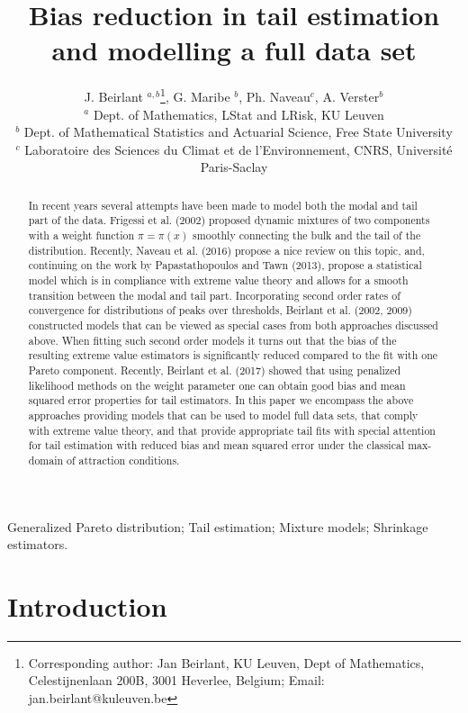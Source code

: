 \documentclass[a4paper,11pt]{article}
\title{Bias reduction in tail estimation and modelling a full data set}
\author{ J. Beirlant $^{a,b}$\footnote{Corresponding author: Jan Beirlant, KU Leuven, Dept of Mathematics, Celestijnenlaan 200B, 3001 Heverlee, Belgium; Email: jan.beirlant@kuleuven.be }, G. Maribe $^{b}$,  Ph. Naveau$^{c}$, A. Verster$^{b}$  \\
{\fontsize{8pt}{11pt} \selectfont $^a$ Dept. of Mathematics, LStat and LRisk, KU Leuven}
\\
{\fontsize{8pt}{11pt} \selectfont $^b$ Dept. of Mathematical Statistics and Actuarial Science, Free State University }
\\
{\fontsize{8pt}{11pt} \selectfont $^c$ Laboratoire des Sciences du Climat et de l'Environnement, CNRS, Universit\'e Paris-Saclay}
}
\begin{document}
 
\maketitle
\begin{abstract}
{\noindent In recent years several attempts have been made to model both the modal and tail part of the data. 
Frigessi et al. (2002) proposed dynamic mixtures of two components with a weight function $\pi=\pi (x)$ smoothly connecting the bulk and the tail of the distribution. 
Recently,  Naveau et al. (2016) propose a nice review on this topic, and, continuing on the work by Papastathopoulos and Tawn (2013), propose a statistical model which is in compliance with extreme value theory and allows for a smooth transition  between the modal and tail part.
Incorporating second order rates of convergence for distributions of peaks over thresholds, Beirlant et al. (2002, 2009) constructed  models that can be viewed as special cases from both approaches discussed above. When fitting such second order models it turns out that the bias of the resulting extreme value estimators is significantly reduced compared to the fit with one Pareto component. Recently, Beirlant et al. (2017) showed that using penalized likelihood methods on the weight parameter one can obtain good bias and mean squared error properties for tail estimators. In this paper we encompass the above approaches providing models that can be used to model full data sets, that comply with extreme value theory, and that provide appropriate tail fits with special attention for tail estimation with reduced bias and mean squared error under the classical max-domain of attraction conditions.
 }
\end{abstract}

 Generalized Pareto distribution; Tail estimation; Mixture models; Shrinkage estimators.





\section{Introduction} 
\label{Sec1}              %
\end{document}
